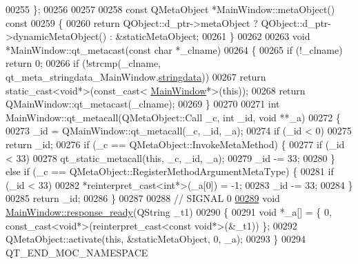 \begin{DoxyCode}
00255 \};
00256 
00257 
00258 \textcolor{keyword}{const} QMetaObject *MainWindow::metaObject()\textcolor{keyword}{ const}
00259 \textcolor{keyword}{}\{
00260     \textcolor{keywordflow}{return} QObject::d\_ptr->metaObject ? QObject::d\_ptr->dynamicMetaObject() : &staticMetaObject;
00261 \}
00262 
00263 \textcolor{keywordtype}{void} *MainWindow::qt\_metacast(\textcolor{keyword}{const} \textcolor{keywordtype}{char} *\_clname)
00264 \{
00265     \textcolor{keywordflow}{if} (!\_clname) \textcolor{keywordflow}{return} 0;
00266     \textcolor{keywordflow}{if} (!strcmp(\_clname, qt\_meta\_stringdata\_MainWindow.\hyperlink{a00066_aa581d4bebf76b40e9469596766315411}{stringdata}))
00267         \textcolor{keywordflow}{return} \textcolor{keyword}{static\_cast<}\textcolor{keywordtype}{void}*\textcolor{keyword}{>}(\textcolor{keyword}{const\_cast<} \hyperlink{a00017}{MainWindow}*\textcolor{keyword}{>}(\textcolor{keyword}{this}));
00268     \textcolor{keywordflow}{return} QMainWindow::qt\_metacast(\_clname);
00269 \}
00270 
00271 \textcolor{keywordtype}{int} MainWindow::qt\_metacall(QMetaObject::Call \_c, \textcolor{keywordtype}{int} \_id, \textcolor{keywordtype}{void} **\_a)
00272 \{
00273     \_id = QMainWindow::qt\_metacall(\_c, \_id, \_a);
00274     \textcolor{keywordflow}{if} (\_id < 0)
00275         \textcolor{keywordflow}{return} \_id;
00276     \textcolor{keywordflow}{if} (\_c == QMetaObject::InvokeMetaMethod) \{
00277         \textcolor{keywordflow}{if} (\_id < 33)
00278             qt\_static\_metacall(\textcolor{keyword}{this}, \_c, \_id, \_a);
00279         \_id -= 33;
00280     \} \textcolor{keywordflow}{else} \textcolor{keywordflow}{if} (\_c == QMetaObject::RegisterMethodArgumentMetaType) \{
00281         \textcolor{keywordflow}{if} (\_id < 33)
00282             *\textcolor{keyword}{reinterpret\_cast<}\textcolor{keywordtype}{int}*\textcolor{keyword}{>}(\_a[0]) = -1;
00283         \_id -= 33;
00284     \}
00285     \textcolor{keywordflow}{return} \_id;
00286 \}
00287 
00288 \textcolor{comment}{// SIGNAL 0}
\hypertarget{a00066_source_l00289}{}\hyperlink{a00017_a3f6396874778799cf07a7a0149e54977}{00289} \textcolor{keywordtype}{void} \hyperlink{a00017_a3f6396874778799cf07a7a0149e54977}{MainWindow::response\_ready}(QString \_t1)
00290 \{
00291     \textcolor{keywordtype}{void} *\_a[] = \{ 0, \textcolor{keyword}{const\_cast<}\textcolor{keywordtype}{void}*\textcolor{keyword}{>}(\textcolor{keyword}{reinterpret\_cast<}\textcolor{keyword}{const }\textcolor{keywordtype}{void}*\textcolor{keyword}{>}(&\_t1)) \};
00292     QMetaObject::activate(\textcolor{keyword}{this}, &staticMetaObject, 0, \_a);
00293 \}
00294 QT\_END\_MOC\_NAMESPACE
\end{DoxyCode}
